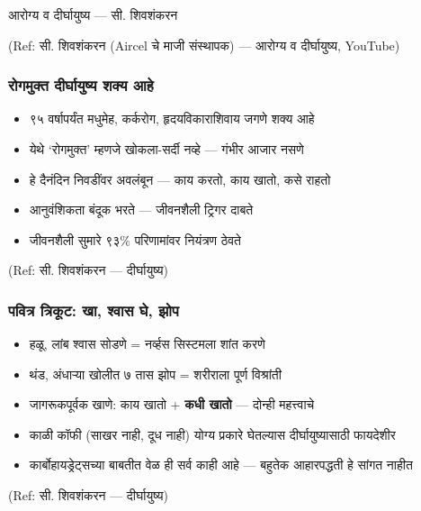 \begin{frame}[fragile]\frametitle{}
\begin{center}
{\Large आरोग्य व दीर्घायुष्य --- सी. शिवशंकरन}
\end{center}

{\tiny (Ref: सी. शिवशंकरन (Aircel चे माजी संस्थापक) --- आरोग्य व दीर्घायुष्य, YouTube)}

\end{frame}

\begin{frame}[fragile]\frametitle{रोगमुक्त दीर्घायुष्य शक्य आहे}

	\begin{itemize}
	\item ९५ वर्षापर्यंत मधुमेह, कर्करोग, हृदयविकाराशिवाय जगणे शक्य आहे
	\item येथे `रोगमुक्त' म्हणजे खोकला-सर्दी नव्हे --- गंभीर आजार नसणे
	\item हे दैनंदिन निवडींवर अवलंबून --- काय करतो, काय खातो, कसे राहतो
	\item आनुवंशिकता बंदूक भरते --- जीवनशैली ट्रिगर दाबते
	\item जीवनशैली सुमारे ९३\% परिणामांवर नियंत्रण ठेवते
	\end{itemize}

{\tiny (Ref: सी. शिवशंकरन --- दीर्घायुष्य)}

\end{frame}

\begin{frame}[fragile]\frametitle{पवित्र त्रिकूट: खा, श्वास घे, झोप}

	\begin{itemize}
	\item हळू, लांब श्वास सोडणे = नर्व्हस सिस्टमला शांत करणे
	\item थंड, अंधाऱ्या खोलीत ७ तास झोप = शरीराला पूर्ण विश्रांती
	\item जागरूकपूर्वक खाणे: काय खातो + \textbf{कधी खातो} --- दोन्ही महत्त्वाचे
	\item काळी कॉफी (साखर नाही, दूध नाही) योग्य प्रकारे घेतल्यास दीर्घायुष्यासाठी फायदेशीर
	\item कार्बोहायड्रेट्सच्या बाबतीत वेळ ही सर्व काही आहे --- बहुतेक आहारपद्धती हे सांगत नाहीत
	\end{itemize}

{\tiny (Ref: सी. शिवशंकरन --- दीर्घायुष्य)}

\end{frame}

